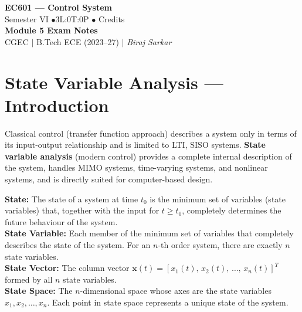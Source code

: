 \documentclass[12pt,a4paper]{article}
\begin{document}

\begin{center}
  {\LARGE\bfseries\color{myred} EC601 --- Control System}\\[5pt]
  {\normalsize\color{mydark} Semester VI \quad$\bullet$\quad 3L:0T:0P \quad$\bullet$ Credits}\\[3pt]
  {\normalsize\color{myteal}\textbf{Module 5 Exam Notes}}\\[3pt]
  {\small\color{mydark} CGEC \;$|$\; B.Tech ECE (2023--27) \;$|$\; \textit{Biraj Sarkar}}
\end{center}
\vspace{2pt}
\noindent{\color{myred}\rule{\linewidth}{1.5pt}}
\vspace{2pt}

\hypersetup{linkcolor=mydark}
\tableofcontents
\hypersetup{linkcolor=myteal}
\newpage

\section{State Variable Analysis --- Introduction}

Classical control (transfer function approach) describes a system only in terms of its input-output relationship and is limited to LTI, SISO systems. \textbf{State variable analysis} (modern control) provides a complete internal description of the system, handles MIMO systems, time-varying systems, and nonlinear systems, and is directly suited for computer-based design.

\begin{tcolorbox}[defbox]
\textbf{State:} The state of a system at time $t_0$ is the minimum set of variables (state variables) that, together with the input for $t \geq t_0$, completely determines the future behaviour of the system.\\[4pt]
\textbf{State Variable:} Each member of the minimum set of variables that completely describes the state of the system. For an $n$-th order system, there are exactly $n$ state variables.\\[4pt]
\textbf{State Vector:} The column vector $\mathbf{x}(t) = [x_1(t),\, x_2(t),\, \ldots,\, x_n(t)]^T$ formed by all $n$ state variables.\\[4pt]
\textbf{State Space:} The $n$-dimensional space whose axes are the state variables $x_1, x_2, \ldots, x_n$. Each point in state space represents a unique state of the system.
\end{tcolorbox}
\end{document}
